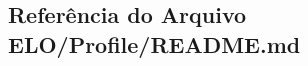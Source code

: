 \hypertarget{ELO_2Profile_2README_8md}{\subsection{Referência do Arquivo E\-L\-O/\-Profile/\-R\-E\-A\-D\-M\-E.md}
\label{ELO_2Profile_2README_8md}
}

